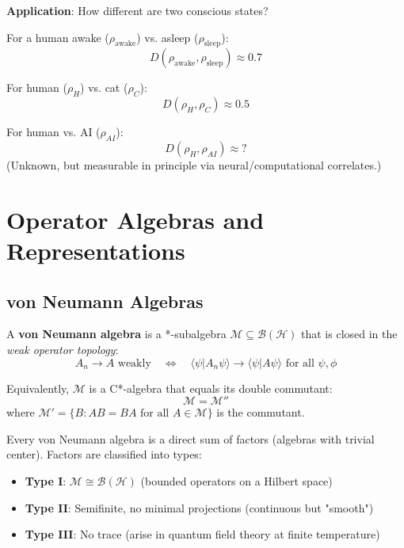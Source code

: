 \textbf{Application}: How different are two conscious states?

For a human awake ($\rho_{\text{awake}}$) vs. asleep ($\rho_{\text{sleep}}$):
\begin{equation}
D(\rho_{\text{awake}}, \rho_{\text{sleep}}) \approx 0.7
\end{equation}

For human ($\rho_H$) vs. cat ($\rho_C$):
\begin{equation}
D(\rho_H, \rho_C) \approx 0.5
\end{equation}

For human vs. AI ($\rho_{AI}$):
\begin{equation}
D(\rho_H, \rho_{AI}) \approx ?
\end{equation}
(Unknown, but measurable in principle via neural/computational correlates.)

\section{Operator Algebras and Representations}

\subsection{von Neumann Algebras}

\begin{definition}\label{def:von-neumann-algebra}
A \textbf{von Neumann algebra} is a *-subalgebra $\mathcal{M} \subseteq \mathcal{B}(\mathcal{H})$ that is closed in the \textit{weak operator topology}:
\begin{equation}
A_n \to A \text{ weakly} \quad \Leftrightarrow \quad \langle \psi | A_n\psi \rangle \to \langle \psi | A\psi \rangle \text{ for all } \psi, \phi
\end{equation}

Equivalently, $\mathcal{M}$ is a C*-algebra that equals its double commutant:
\begin{equation}
\mathcal{M} = \mathcal{M}''
\end{equation}
where $\mathcal{M}' = \{B : AB = BA \text{ for all } A \in \mathcal{M}\}$ is the commutant.
\end{definition}

\begin{theorem}\label{thm:von-neumann-classification}
Every von Neumann algebra is a direct sum of factors (algebras with trivial center). Factors are classified into types:
\begin{itemize}
\item \textbf{Type I}: $\mathcal{M} \cong \mathcal{B}(\mathcal{H})$ (bounded operators on a Hilbert space)
\item \textbf{Type II}: Semifinite, no minimal projections (continuous but "smooth")
\item \textbf{Type III}: No trace (arise in quantum field theory at finite temperature)
\end{itemize}
\end{theorem}


